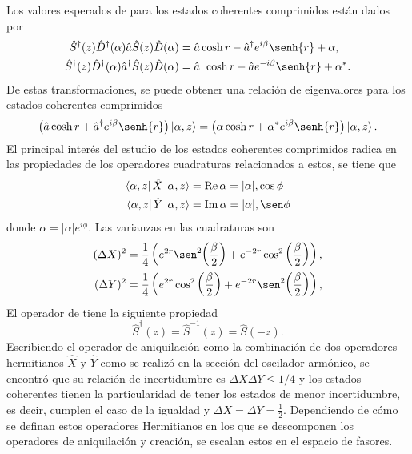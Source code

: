 Los valores esperados de para los estados coherentes comprimidos están dados por
\begin{align}
  \hat{S}^\dagger(z) \hat{D}^\dagger (\alpha) \hat{a} \hat{S}(z) \hat{D}(\alpha)           & = \hat{a} \cosh{r} - \hat{a}^{\dagger} e^{i\beta}\senh{r} + \alpha,    \\
  \hat{S}^\dagger(z) \hat{D}^\dagger (\alpha) \hat{a}^{\dagger} \hat{S}(z) \hat{D}(\alpha) & = \hat{a}^{\dagger} \cosh{r} - \hat{a} e^{-i\beta}\senh{r} + \alpha^*.
\end{align}
De estas transformaciones, se puede obtener una relación de eigenvalores para los estados coherentes comprimidos
\begin{equation}
  \left( \hat{a} \cosh{r} + \hat{a}^{\dagger} e^{i\beta} \senh{r} \right) \ket{\alpha, z} = \left( \alpha \cosh{r} + \alpha^* e^{i\beta} \senh{r} \right) \ket{\alpha, z}.
\end{equation}
El principal interés del estudio de los estados coherentes comprimidos radica en las propiedades de los operadores cuadraturas relacionados a estos, se tiene que
\begin{align}
  \bra{\alpha, z}\hat{X}\ket{\alpha, z}   & = \Re \alpha = |\alpha|, \cos\phi \\
  \bra{\alpha, z} \hat{Y} \ket{\alpha, z} & = \Im \alpha = |\alpha| ,\sen\phi
\end{align}
donde $\alpha = |\alpha|e^{i\phi}$. Las varianzas en las cuadraturas son
\begin{align}
  (\Delta X)^2 & = \frac{1}{4}\left( e^{2r}\sen^2{\left( \frac{\beta}{2} \right)} +e^{-2r}\cos^2{\left( \frac{\beta}{2} \right)} \right), \\
  (\Delta Y)^2 & = \frac{1}{4}\left( e^{2r}\cos^2{\left( \frac{\beta}{2} \right)} +e^{-2r}\sen^2{\left( \frac{\beta}{2} \right)} \right),
\end{align}
El operador de tiene la siguiente propiedad
\begin{equation}
  \hat{S}^{\dagger}(z) = \hat{S}^{-1}(z) = \hat{S}(-z).
\end{equation}
Escribiendo el operador de aniquilación como la combinación de dos operadores hermitianos $\hat{X}$ y $\hat{Y}$ como se realizó en la sección del oscilador armónico, se encontró que su relación de incertidumbre es $\Delta X \Delta Y \leq 1/4$ y los estados coherentes tienen la particularidad de tener los estados de menor incertidumbre, es decir, cumplen el caso de la igualdad y $\Delta X = \Delta Y = \frac{1}{2}$. Dependiendo de cómo se definan estos operadores Hermitianos en los que se descomponen los operadores de aniquilación y creación, se escalan estos en el espacio de fasores.

